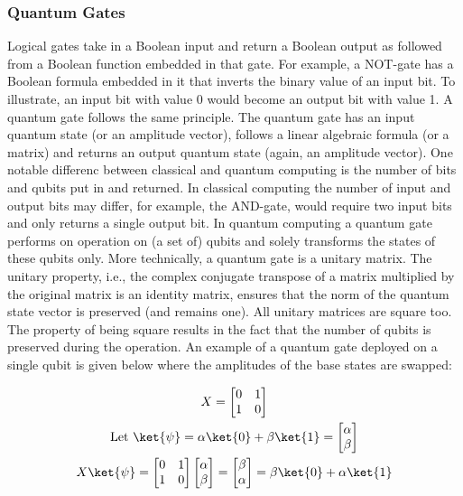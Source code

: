 \documentclass[../main.tex]{subfiles}
\begin{document}
\subsubsection*{Quantum Gates}
Logical gates take in a Boolean input and return a Boolean output as followed from a Boolean function embedded in that gate. For example, a NOT-gate has a Boolean formula embedded in it that inverts the binary value of an input bit. To illustrate, an input bit with value 0 would become an output bit with value 1. A quantum gate follows the same principle. The quantum gate has an input quantum state (or an amplitude vector), follows a linear algebraic formula (or a matrix) and returns an output quantum state (again, an amplitude vector). One notable differenc between classical and quantum computing is the number of bits and qubits put in and returned. In classical computing the number of input and output bits may differ, for example, the AND-gate, would require two input bits and only returns a single output bit. In quantum computing a quantum gate performs on operation on (a set of) qubits and solely transforms the states of these qubits only. More technically, a quantum gate is a unitary matrix.  The unitary property, i.e., the complex conjugate transpose of a matrix multiplied by the original matrix is an identity matrix, ensures that the norm of the quantum state vector is preserved (and remains one). All unitary matrices are square too. The property of being square results in the fact that the number of qubits is preserved during the operation. An example of a quantum gate deployed on a single qubit is given below where the amplitudes of the base states are swapped:

\begin{gather}
    X = \begin{bmatrix} 
    0 & 1 \\
    1 & 0 \\
    \end{bmatrix} 
    \label{eq: gate_x}\\
    \text{Let } \ket{\psi} = \alpha \ket{0} + \beta \ket{1} = \begin{bmatrix}\alpha \\ \beta \end{bmatrix} \\
    X\ket{\psi} =  \begin{bmatrix} 
        0 & 1 \\
        1 & 0 \\
        \end{bmatrix} \begin{bmatrix}\alpha \\ \beta \end{bmatrix}  = \begin{bmatrix}\beta \\ \alpha \end{bmatrix} = \beta \ket{0} + \alpha \ket{1}
\end{gather}
\end{document}
